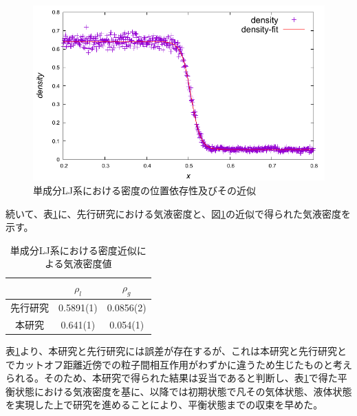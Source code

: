\documentclass[titlepage]{jsreport}
\begin{document}
\begin{figure}[htbp]
    \begin{center}
        \includegraphics[width=14cm]{fig/ln78732-rn10976-ld0.629856-rd0.087808/ln78732-rn10976-ld0.629856-rd0.087808-fitting.pdf}
    \end{center}
    \caption{単成分LJ系における密度の位置依存性及びその近似}
    \label{fig:ln78732-rn10976-ld0.629856-rd0.087808-fitting}
\end{figure}

\newpage
続いて、表\ref{table:ln78732-rn10976-ld0.629856-rd0.087808-fitting}に、先行研究\cite{gas-liquid-equilibrium}における気液密度と、図\ref{fig:ln78732-rn10976-ld0.629856-rd0.087808-fitting}の近似で得られた気液密度を示す。

\begin{table}[htbp]
    \begin{center}
        \caption{単成分LJ系における密度近似による気液密度値}
        \label{table:ln78732-rn10976-ld0.629856-rd0.087808-fitting}
            \begin{tabular}{c | c c}
                & $\rho_l$ & $\rho_g$ \\\hline
                先行研究 & 0.5891(1) & 0.0856(2) \\
                本研究 & 0.641(1) & 0.054(1)
            \end{tabular}
    \end{center}
\end{table}

表\ref{table:ln78732-rn10976-ld0.629856-rd0.087808-fitting}より、本研究と先行研究には誤差が存在するが、これは本研究と先行研究とでカットオフ距離近傍での粒子間相互作用がわずかに違うため生じたものと考えられる。そのため、本研究で得られた結果は妥当であると判断し、表\ref{table:ln78732-rn10976-ld0.629856-rd0.087808-fitting}で得た平衡状態における気液密度を基に、以降では初期状態で凡その気体状態、液体状態を実現した上で研究を進めることにより、平衡状態までの収束を早めた。
\end{document}
